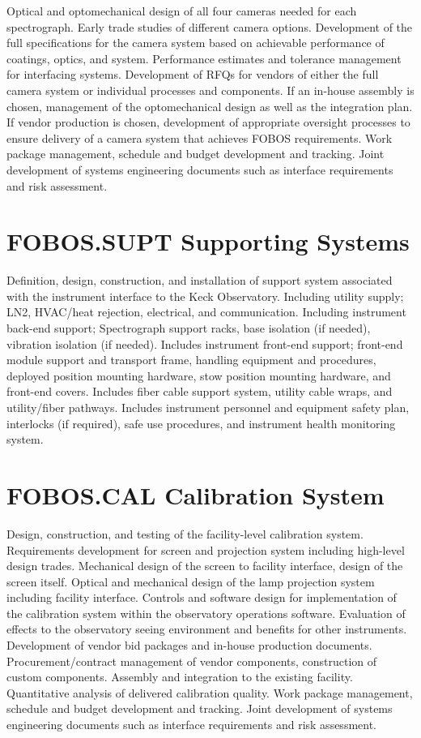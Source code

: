 \documentclass[oneside,11pt]{amsart}
\begin{document}
Optical and optomechanical design of all four cameras needed for each
spectrograph. Early trade studies of different camera options.
Development of the full specifications for the camera system based on
achievable performance of coatings, optics, and system. Performance
estimates and tolerance management for interfacing systems.
Development of RFQs for vendors of either the full camera system or
individual processes and components. If an in-house assembly is
chosen, management of the optomechanical design as well as the
integration plan. If vendor production is chosen, development of
appropriate oversight processes to ensure delivery of a camera system
that achieves FOBOS requirements. Work package management, schedule
and budget development and tracking. Joint development of systems
engineering documents such as interface requirements and risk
assessment.

\section{FOBOS.SUPT Supporting Systems}

Definition, design, construction, and installation of support system
associated with the instrument interface to the Keck Observatory.
Including utility supply; LN2, HVAC/heat rejection, electrical, and
communication. Including instrument back-end support; Spectrograph
support racks, base isolation (if needed), vibration isolation (if
needed). Includes instrument front-end support; front-end module
support and transport frame, handling equipment and procedures,
deployed position mounting hardware, stow position mounting hardware,
and front-end covers. Includes fiber cable support system, utility
cable wraps, and utility/fiber pathways. Includes instrument
personnel and equipment safety plan, interlocks (if required), safe
use procedures, and instrument health monitoring system.

\section{FOBOS.CAL Calibration System}

Design, construction, and testing of the facility-level calibration
system. Requirements development for screen and projection system
including high-level design trades. Mechanical design of the screen
to facility interface, design of the screen itself. Optical and
mechanical design of the lamp projection system including facility
interface. Controls and software design for implementation of the
calibration system within the observatory operations software.
Evaluation of effects to the observatory seeing environment and
benefits for other instruments. Development of vendor bid packages
and in-house production documents. Procurement/contract management of
vendor components, construction of custom components. Assembly and
integration to the existing facility. Quantitative analysis of
delivered calibration quality. Work package management, schedule and
budget development and tracking. Joint development of systems
engineering documents such as interface requirements and risk
assessment.
\end{document}
